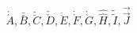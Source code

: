\documentclass{book}
\begin{document}
$$ \acute{\acute{A}},\bar{\bar{B}},
\breve{\breve{C}},\check{\check{D}},
\ddot{\ddot{E}},\dot{\dot{F}},
\grave{\grave{G}},\hat{\hat{H}},
\tilde{\tilde{I}},\vec{\vec{J}} $$
\end{document}
